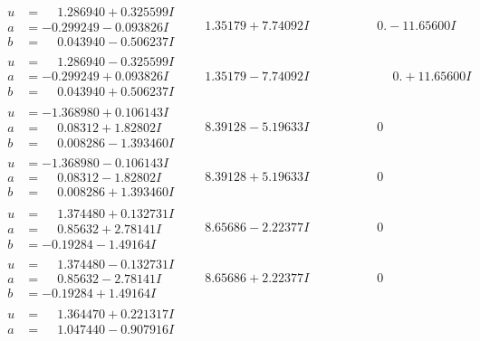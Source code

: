 \documentclass[1p]{elsarticle_modified}
\theoremstyle{definition}
\begin{document}
$$\begin{array}{c|c|c}
\begin{aligned}
u &= \phantom{-}1.286940 + 0.325599 I \\
a &= -0.299249 - 0.093826 I \\
b &= \phantom{-}0.043940 - 0.506237 I\end{aligned}
 & \phantom{-}1.35179 + 7.74092 I & \phantom{-0.000000 } 0. - 11.65600 I \\ \hline\begin{aligned}
u &= \phantom{-}1.286940 - 0.325599 I \\
a &= -0.299249 + 0.093826 I \\
b &= \phantom{-}0.043940 + 0.506237 I\end{aligned}
 & \phantom{-}1.35179 - 7.74092 I & \phantom{-0.000000 -}0. + 11.65600 I \\ \hline\begin{aligned}
u &= -1.368980 + 0.106143 I \\
a &= \phantom{-}0.08312 + 1.82802 I \\
b &= \phantom{-}0.008286 - 1.393460 I\end{aligned}
 & \phantom{-}8.39128 - 5.19633 I & \phantom{-0.000000 } 0 \\ \hline\begin{aligned}
u &= -1.368980 - 0.106143 I \\
a &= \phantom{-}0.08312 - 1.82802 I \\
b &= \phantom{-}0.008286 + 1.393460 I\end{aligned}
 & \phantom{-}8.39128 + 5.19633 I & \phantom{-0.000000 } 0 \\ \hline\begin{aligned}
u &= \phantom{-}1.374480 + 0.132731 I \\
a &= \phantom{-}0.85632 + 2.78141 I \\
b &= -0.19284 - 1.49164 I\end{aligned}
 & \phantom{-}8.65686 - 2.22377 I & \phantom{-0.000000 } 0 \\ \hline\begin{aligned}
u &= \phantom{-}1.374480 - 0.132731 I \\
a &= \phantom{-}0.85632 - 2.78141 I \\
b &= -0.19284 + 1.49164 I\end{aligned}
 & \phantom{-}8.65686 + 2.22377 I & \phantom{-0.000000 } 0 \\ \hline\begin{aligned}
u &= \phantom{-}1.364470 + 0.221317 I \\
a &= \phantom{-}1.047440 - 0.907916 I \\

\end{aligned}
\end{array}$$
\end{document}

